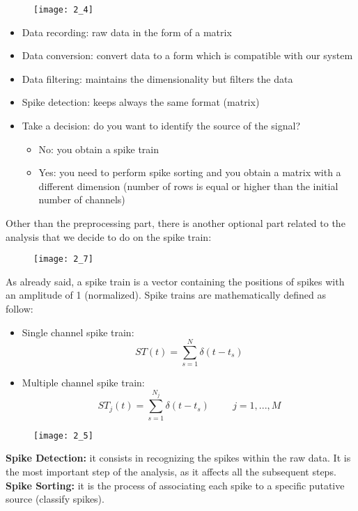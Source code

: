 \begin{figure}[H]
    \texttt{[image: 2\_4]}
    \centering
\end{figure}
\begin{itemize}
    \item Data recording: raw data in the form of a matrix
    \item Data conversion: convert data to a form which is compatible with our system
    \item Data filtering: maintains the dimensionality but filters the data
    \item Spike detection: keeps always the same format (matrix)
    \item Take a decision: do you want to identify the source of the signal? 
    \begin{itemize}
        \item No: you obtain a spike train 
        \item Yes: you need to perform spike sorting and you obtain a matrix with a different dimension (number of rows is equal or higher than the initial number of channels)
    \end{itemize}
\end{itemize}
Other than the preprocessing part, there is another optional part related to the analysis that we decide to do on the spike train:
\begin{figure}[H]
    \texttt{[image: 2\_7]}
    \centering
\end{figure}
As already said, a spike train is a vector containing the positions of spikes with an amplitude of 1 (normalized). 
Spike trains are mathematically defined as follow:
\begin{itemize}
    \item Single channel spike train:
    \begin{equation*}
        ST(t)=\sum_{s=1}^{N}\delta{(t-t_s)}
    \end{equation*}
    \item Multiple channel spike train:
    \begin{equation*}
        ST_j(t)=\sum_{s=1}^{N_j}\delta(t-t_s) \hspace{1cm} j=1,...,M
    \end{equation*}
\end{itemize}
\begin{figure}[H]
    \texttt{[image: 2\_5]}
    \centering
\end{figure}
\textbf{Spike Detection:} it consists in recognizing the spikes within the raw data. It is the most important step of the analysis, as it affects all the subsequent steps.\\
\textbf{Spike Sorting:} it is the process of associating each spike to a specific putative source (classify spikes).\\


